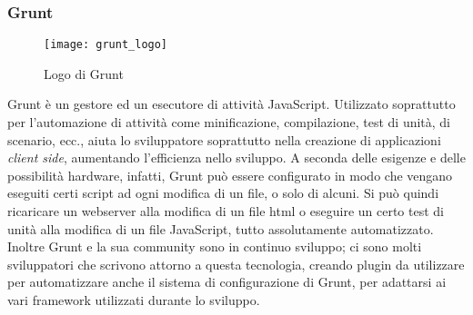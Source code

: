 \subsubsection{Grunt}
\begin{figure}[htb] 
    \centering 
    \texttt{[image: grunt\_logo]} 
    \caption{Logo di Grunt}
\end{figure}
Grunt è un gestore ed un esecutore di attività JavaScript. Utilizzato soprattutto per l’automazione di attività come minificazione, compilazione, test di unità, di scenario, ecc., aiuta lo sviluppatore soprattutto nella creazione di applicazioni \emph{client side}, aumentando l’efficienza nello sviluppo. 
A seconda delle esigenze e delle possibilità hardware, infatti, Grunt può essere configurato in modo che vengano eseguiti certi script ad ogni modifica di un file, o solo di alcuni. Si può quindi ricaricare un webserver alla modifica di un file html o eseguire un certo test di unità alla modifica di un file JavaScript, tutto assolutamente automatizzato.\\
Inoltre Grunt e la sua community sono in continuo sviluppo; ci sono molti sviluppatori che scrivono attorno a questa tecnologia, creando plugin da utilizzare per automatizzare anche il sistema di configurazione di Grunt, per adattarsi ai vari framework utilizzati durante lo sviluppo.

